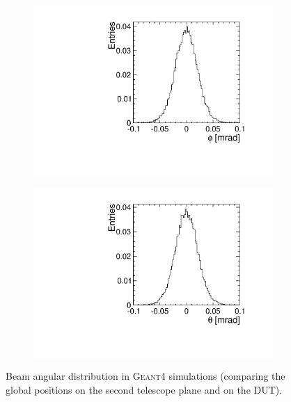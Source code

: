 \begin{figure}[htbp] \centering
  \begin{subfigure}[b]{0.45\textwidth}
    \includegraphics[width=\textwidth]{./figures/Telescope/MC_trackAnglePhi_planes_302_100.pdf}
    \caption{}
  \end{subfigure}\hfill
  \begin{subfigure}[b]{0.45\textwidth}
    \includegraphics[width=\textwidth]{./figures/Telescope/MC_trackAngleTheta_planes_302_100.pdf}
    \caption{}
  \end{subfigure}
  \caption{Beam angular distribution in \textsc{Geant4} simulations
(comparing the global positions on the second telescope plane and on
the DUT).}
  \label{fig:MCbeamAngleDistr}
\end{figure}
